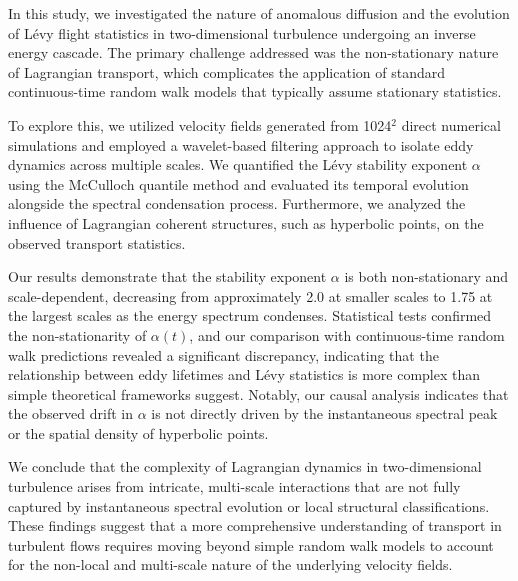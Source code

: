 \documentclass[]{article}
\begin{document}
In this study, we investigated the nature of anomalous diffusion and the evolution of Lévy flight statistics in two-dimensional turbulence undergoing an inverse energy cascade. The primary challenge addressed was the non-stationary nature of Lagrangian transport, which complicates the application of standard continuous-time random walk models that typically assume stationary statistics.

To explore this, we utilized velocity fields generated from 1024$^2$ direct numerical simulations and employed a wavelet-based filtering approach to isolate eddy dynamics across multiple scales. We quantified the Lévy stability exponent $\alpha$ using the McCulloch quantile method and evaluated its temporal evolution alongside the spectral condensation process. Furthermore, we analyzed the influence of Lagrangian coherent structures, such as hyperbolic points, on the observed transport statistics.

Our results demonstrate that the stability exponent $\alpha$ is both non-stationary and scale-dependent, decreasing from approximately 2.0 at smaller scales to 1.75 at the largest scales as the energy spectrum condenses. Statistical tests confirmed the non-stationarity of $\alpha(t)$, and our comparison with continuous-time random walk predictions revealed a significant discrepancy, indicating that the relationship between eddy lifetimes and Lévy statistics is more complex than simple theoretical frameworks suggest. Notably, our causal analysis indicates that the observed drift in $\alpha$ is not directly driven by the instantaneous spectral peak or the spatial density of hyperbolic points.

We conclude that the complexity of Lagrangian dynamics in two-dimensional turbulence arises from intricate, multi-scale interactions that are not fully captured by instantaneous spectral evolution or local structural classifications. These findings suggest that a more comprehensive understanding of transport in turbulent flows requires moving beyond simple random walk models to account for the non-local and multi-scale nature of the underlying velocity fields.
\end{document}

